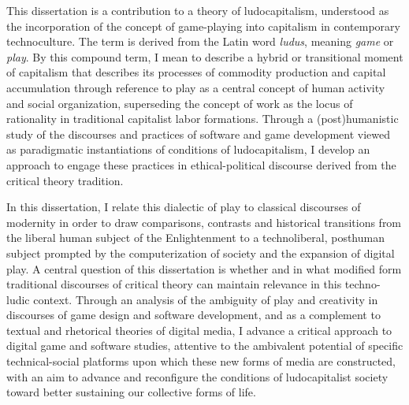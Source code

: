 This dissertation is a contribution to a theory of ludocapitalism, understood as the incorporation of the concept of game-playing into capitalism in contemporary technoculture. The term is derived from the Latin word \emph{ludus}, meaning \emph{game} or \emph{play}. By this compound term, I mean to describe a hybrid or transitional moment of capitalism that describes its processes of commodity production and capital accumulation through reference to play as a central concept of human activity and social organization, superseding the concept of work as the locus of rationality in traditional capitalist labor formations. Through a (post)humanistic study of the discourses and practices of software and game development viewed as paradigmatic instantiations of conditions of ludocapitalism, I develop an approach to engage these practices in ethical-political discourse derived from the critical theory tradition.

In this dissertation, I relate this dialectic of play to classical discourses of modernity in order to draw comparisons, contrasts and historical transitions from the liberal human subject of the Enlightenment to a technoliberal, posthuman subject prompted by the computerization of society and the expansion of digital play. A central question of this dissertation is whether and in what modified form traditional discourses of critical theory can maintain relevance in this techno-ludic context. Through an analysis of the ambiguity of play and creativity in discourses of game design and software development, and as a complement to textual and rhetorical theories of digital media, I advance a critical approach to digital game and software studies, attentive to the ambivalent potential of specific technical-social platforms upon which these new forms of media are constructed, with an aim to advance and reconfigure the conditions of ludocapitalist society toward better sustaining our collective forms of life.
